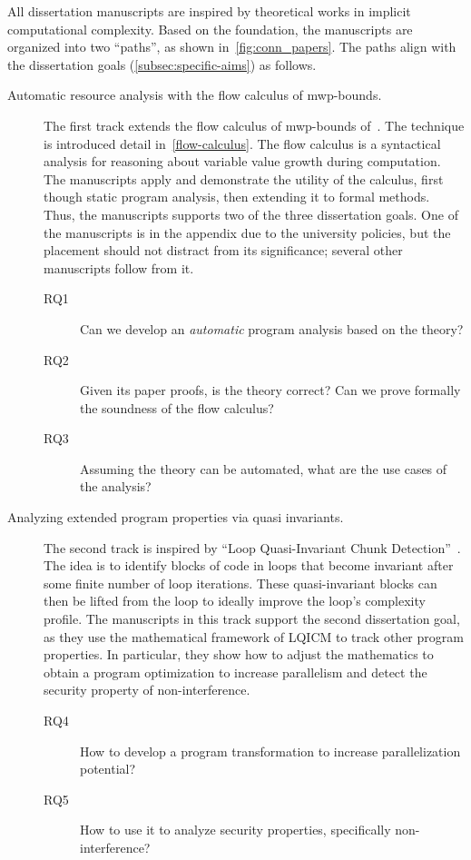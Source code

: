 All dissertation manuscripts are inspired by theoretical works in implicit computational complexity.
Based on the foundation, the manuscripts are organized into two \enquote{paths}, as shown in~\autoref{fig:conn_papers}.
The paths align with the dissertation goals (\autoref{subsec:specific-aims}) as follows.

\begin{description}
\item[Automatic resource analysis with the flow calculus of mwp-bounds.]
The first track extends the flow calculus of mwp-bounds of~\textcite{jones2009}.
The technique is introduced detail in~\autoref{flow-calculus}.
The flow calculus is a syntactical analysis for reasoning about variable value growth during computation.
The manuscripts apply and demonstrate the utility of the calculus, first though static program analysis, then extending it to formal methods.
Thus, the manuscripts supports two of the three dissertation goals.
One of the manuscripts is in the appendix due to the university policies, but the placement should not distract from its significance;
several other manuscripts follow from it.

\begin{description}
\item[RQ1] Can we develop an \emph{automatic} program analysis based on the theory?
\item[RQ2] Given its paper proofs, is the theory correct? Can we prove formally the soundness of the flow calculus?
\item[RQ3] Assuming the theory can be automated, what are the use cases of the analysis?
\end{description}

\item[Analyzing extended program properties via quasi invariants.]
The second track is inspired by \enquote{Loop Quasi-Invariant Chunk Detection}~\cite{moyen20172}.
The idea is to identify blocks of code in loops that become invariant after some finite number of loop iterations.
These quasi-invariant blocks can then be lifted from the loop to ideally improve the loop's complexity profile.
The manuscripts in this track support the second dissertation goal,
as they use the mathematical framework of LQICM to track other program properties.
In particular, they show how to adjust the mathematics to obtain a program optimization to increase parallelism and detect the security property of non-interference.

\begin{description}
\item[RQ4] How to develop a program transformation to increase parallelization potential?
\item[RQ5] How to use it to analyze security properties, specifically non-interference?
\end{description}


\end{description}
